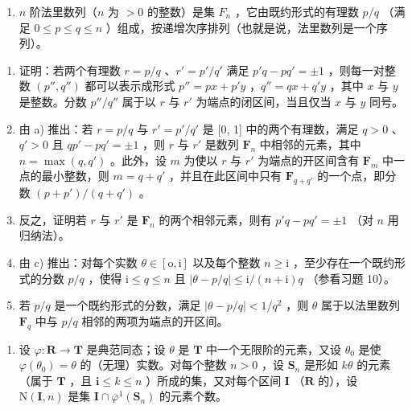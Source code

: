 \begin{enumerate}
\def\labelenumi{\arabic{enumi})}
\setcounter{enumi}{12}
\tightlist
\item
  \(n\) 阶法里数列（\(n\) 为 \(>0\) 的整数）是集 \(F_n\) ，它由既约形式的有理数 \(p/q\) （满足 \(0 \leqslant p \leqslant q \leqslant n\) ）组成，按递增次序排列（也就是说，法里数列是一个序列）。
\end{enumerate}

\begin{enumerate}
\def\labelenumi{\alph{enumi})}
\item
  证明：若两个有理数 \(r = p / q\) 、\(r' = p' / q'\) 满足 \(p'q - pq' = \pm 1\) ，则每一对整数 \((p'', q'')\) 都可以表示成形式 \(p'' = px + p'y\) ，\(q'' = qx + q'y\) ，其中 \(x\) 与 \(y\) 是整数。分数 \(p'' / q''\) 属于以 \(r\) 与 \(r'\) 为端点的闭区间，当且仅当 \(x\) 与 \(y\) 同号。
\item
  由 a) 推出：若 \(r = p / q\) 与 \(r' = p' / q'\) 是 {[}0, 1{]} 中的两个有理数，满足 \(q > 0\) 、\(q' > 0\) 且 \(qp' - pq' = \pm 1\) ，则 \(r\) 与 \(r'\) 是数列 \(\mathbf{F}_n\) 中相邻的元素，其中 \(n = \max (q, q')\) 。此外，设 \(m\) 为使以 \(r\) 与 \(r'\) 为端点的开区间含有 \(\mathbf{F}_m\) 中一点的最小整数，则 \(m = q + q'\) ，并且在此区间中只有 \(\mathbf{F}_{q + q'}\) 的一个点，即分数 \((p + p') / (q + q')\) 。
\item
  反之，证明若 \(r\) 与 \(r'\) 是 \(\mathbf{F}_n\) 的两个相邻元素，则有 \(p'q - pq' = \pm 1\) （对 \(n\) 用归纳法）。
\item
  由 c) 推出：对每个实数 \(\theta \in [\mathrm{o},\mathrm{i}]\) 以及每个整数 \(n\geqslant \mathrm{i}\) ，至少存在一个既约形式的分数 \(p / q\) ，使得 \(\mathrm{i}\leqslant q\leqslant n\) 且 \(|\theta -p / q|\leqslant \mathrm{i} / (n + \mathrm{i})q\) （参看习题 10）。
\item
  若 \(p / q\) 是一个既约形式的分数，满足 \(|\theta - p / q| < 1 / q^2\) ，则 \(\theta\) 属于以法里数列 \(\mathbf{F}_q\) 中与 \(p / q\) 相邻的两项为端点的开区间。
\end{enumerate}

\begin{enumerate}
\def\labelenumi{\arabic{enumi})}
\setcounter{enumi}{13}
\tightlist
\item
  设 \(\varphi: \mathbf{R} \to \mathbf{T}\) 是典范同态；设 \(\theta\) 是 \(\mathbf{T}\) 中一个无限阶的元素，又设 \(\theta_0\) 是使 \(\varphi(\theta_0) = \theta\) 的（无理）实数。对每个整数 \(n > 0\) ，设 \(\mathbf{S}_n\) 是形如 \(k\theta\) 的元素（属于 \(\mathbf{T}\) ，且 \(\mathbf{i} \leqslant k \leqslant n\) ）所成的集，又对每个区间 \(\mathbf{I}\) （\(\mathbf{R}\) 的），设 \(\mathrm{N}(\mathbf{I}, n)\) 是集 \(\mathbf{I} \cap \overline{\varphi}^1(\mathbf{S}_n)\) 的元素个数。
\end{enumerate}

